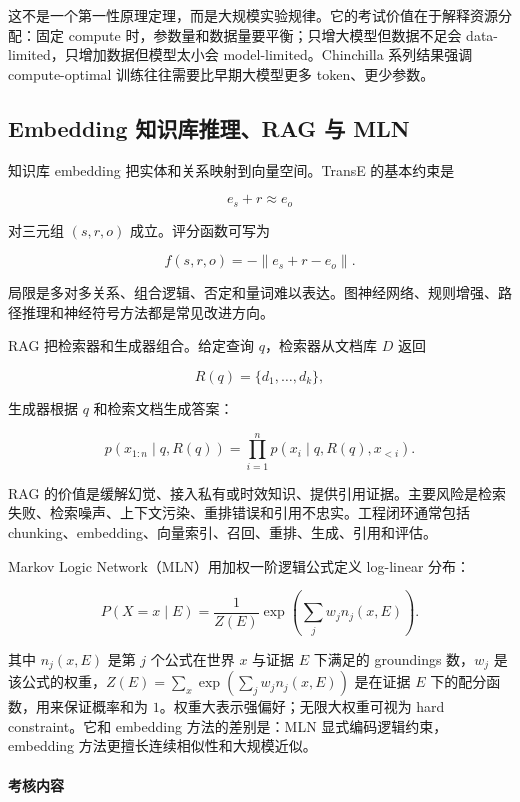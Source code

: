 这不是一个第一性原理定理，而是大规模实验规律。它的考试价值在于解释资源分配：固定 compute 时，参数量和数据量要平衡；只增大模型但数据不足会 data-limited，只增加数据但模型太小会 model-limited。Chinchilla 系列结果强调 compute-optimal 训练往往需要比早期大模型更多 token、更少参数。

\subsection{Embedding 知识库推理、RAG 与 MLN}


知识库 embedding 把实体和关系映射到向量空间。TransE 的基本约束是

\[
  e_s+r\approx e_o
\]

对三元组 \((s,r,o)\) 成立。评分函数可写为

\[
  f(s,r,o)=-\|e_s+r-e_o\|.
\]

局限是多对多关系、组合逻辑、否定和量词难以表达。图神经网络、规则增强、路径推理和神经符号方法都是常见改进方向。

RAG 把检索器和生成器组合。给定查询 \(q\)，检索器从文档库 \(D\) 返回

\[
  R(q)=\{d_1,\ldots,d_k\},
\]

生成器根据 \(q\) 和检索文档生成答案：

\[
  p(x_{1:n}\mid q,R(q))
  =
  \prod_{i=1}^{n}
  p(x_i\mid q,R(q),x_{<i}).
\]

RAG 的价值是缓解幻觉、接入私有或时效知识、提供引用证据。主要风险是检索失败、检索噪声、上下文污染、重排错误和引用不忠实。工程闭环通常包括 chunking、embedding、向量索引、召回、重排、生成、引用和评估。

Markov Logic Network（MLN）用加权一阶逻辑公式定义 log-linear 分布：

\[
  P(X=x\mid E)
  =
  \frac{1}{Z(E)}
  \exp
  \left(
    \sum_j w_j n_j(x,E)
  \right).
\]

其中 \(n_j(x,E)\) 是第 \(j\) 个公式在世界 \(x\) 与证据 \(E\) 下满足的 groundings 数，\(w_j\) 是该公式的权重，\(Z(E)=\sum_x \exp(\sum_j w_j n_j(x,E))\) 是在证据 \(E\) 下的配分函数，用来保证概率和为 \(1\)。权重大表示强偏好；无限大权重可视为 hard constraint。它和 embedding 方法的差别是：MLN 显式编码逻辑约束，embedding 方法更擅长连续相似性和大规模近似。

\paragraph{考核内容}

